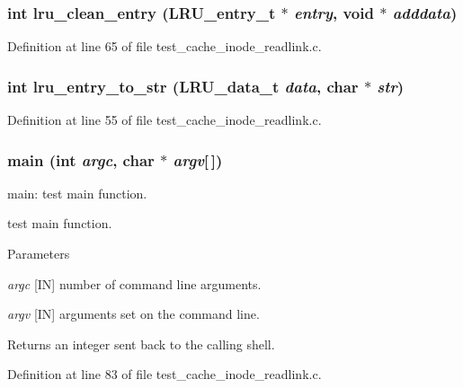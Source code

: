\subsubsection[{lru\_\-clean\_\-entry}]{\setlength{\rightskip}{0pt plus 5cm}int lru\_\-clean\_\-entry (LRU\_\-entry\_\-t $\ast$ {\em entry}, \/  void $\ast$ {\em adddata})}\label{test__cache__inode__readlink_8c_a27ecbab481a3103e078489a212a52e3f}


Definition at line 65 of file test\_\-cache\_\-inode\_\-readlink.c.
\subsubsection[{lru\_\-entry\_\-to\_\-str}]{\setlength{\rightskip}{0pt plus 5cm}int lru\_\-entry\_\-to\_\-str (LRU\_\-data\_\-t {\em data}, \/  char $\ast$ {\em str})}\label{test__cache__inode__readlink_8c_ad3e6e5506644e1986e6475939863ad3e}


Definition at line 55 of file test\_\-cache\_\-inode\_\-readlink.c.
\subsubsection[{main}]{\setlength{\rightskip}{0pt plus 5cm}main (int {\em argc}, \/  char $\ast$ {\em argv}[$\,$])}\label{test__cache__inode__readlink_8c_ae0665038b72011f5c680c660fcb59459}
main: test main function.

test main function.


\begin{DoxyParams}{Parameters}
\item[{\em argc}][IN] number of command line arguments. \item[{\em argv}][IN] arguments set on the command line.\end{DoxyParams}
\begin{DoxyReturn}{Returns}
an integer sent back to the calling shell. 
\end{DoxyReturn}


Definition at line 83 of file test\_\-cache\_\-inode\_\-readlink.c.
